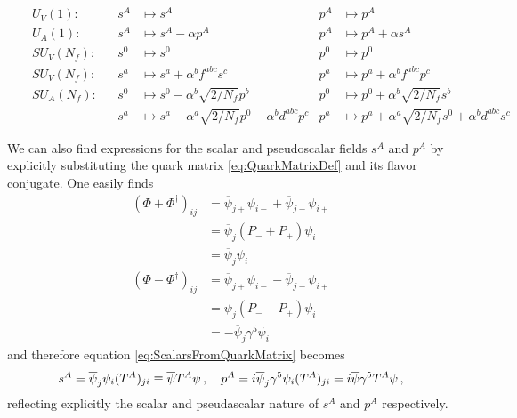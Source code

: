 \begin{subequations}
    \begin{align}
        &  & U_V(1): &  & s^A            & \mapsto s^A & p^A & \mapsto p^A              &  & \\
         &  & U_A(1): &  & s^A            & \mapsto s^A-\alpha p^A                                                              & p^A & \mapsto p^A+\alpha s^A &  & \\
         &  & SU_V(N_f): &  & s^0            & \mapsto s^0                                                    & p^0 & \mapsto p^0               &  & \\
         &  & SU_V(N_f): &  & s^a            & \mapsto s^a+\alpha^bf^{abc}s^c                                                    & p^a & \mapsto p^a+\alpha^bf^{abc}p^c               &  & \\
         &  & SU_A(N_f): &  & s^0& \mapsto s^0-\alpha^b\sqrt{2/N_f}p^b& p^0 & \mapsto p^0+\alpha^b\sqrt{2/N_f}s^b &  & \\
         &  &  &  & s^a& \mapsto s^a-\alpha^a\sqrt{2/N_f}p^0-\alpha^bd^{abc}p^c& p^a & \mapsto p^a+\alpha^a\sqrt{2/N_f}s^0+\alpha^bd^{abc}s^c &  & 
    \end{align}
\end{subequations}

We can also find expressions for the scalar and pseudoscalar fields $s^A$ and $p^A$ by explicitly substituting the quark matrix \eqref{eq:QuarkMatrixDef} and its flavor conjugate. One easily finds
\begin{subequations}
    \begin{align}
        (\Phi+\Phi^\dagger)_{ij}&=\overline{\psi}_{j+}\psi_{i-}+\overline{\psi}_{j-}\psi_{i+}\\
        &=\overline{\psi}_j(P_-+P_+)\psi_i\\
        &=\overline{\psi}_j\psi_i\\
        (\Phi-\Phi^\dagger)_{ij}&=\overline{\psi}_{j+}\psi_{i-}-\overline{\psi}_{j-}\psi_{i+}\\
        &=\overline{\psi}_j(P_--P_+)\psi_i\\
        &=-\overline{\psi}_j\gamma^5\psi_i
    \end{align}
\end{subequations}
and therefore equation \eqref{eq:ScalarsFromQuarkMatrix} becomes
\begin{equation}
    s^A=\overline{\psi}_j\psi_i(T^A)_{ji}\equiv\overline{\psi}T^A\psi\,,\quad p^A={i}\overline{\psi}_j\gamma^5\psi_i(T^A)_{ji}={i}\overline{\psi}\gamma^5T^A\psi\,,
\end{equation}
reflecting explicitly the scalar and pseudascalar nature of $s^A$ and $p^A$ respectively.

